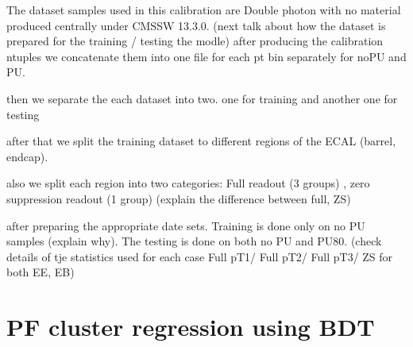 The dataset samples used in this calibration are Double photon with no material produced centrally under CMSSW 13.3.0.
(next talk about how the dataset is prepared for the training / testing the modle) 
after producing the calibration ntuples we concatenate them into one file for each pt bin separately for noPU and PU. 


then we separate the each dataset into two. one for training and another one for testing

after that we split the training dataset to different regions of the ECAL (barrel, endcap).

also we split each region into two categories: Full readout (3 groups) , zero suppression readout (1 group)
(explain the difference between full, ZS) 


after preparing the appropriate date sets. Training is done only on no PU samples (explain why).
The testing is done on both no PU and PU80. 
(check details of tje  statistics used for each case Full pT1/ Full pT2/ Full pT3/ ZS for both EE, EB)



\section{PF cluster regression using BDT}

